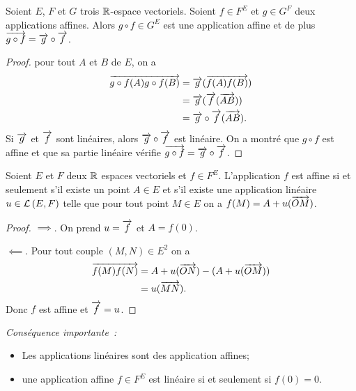 \begin{prop}
  Soient \(E\), \(F\) et \(G\) trois \(\mathbb{R}\)-espace vectoriels. Soient \(f \in
  F^E\) et \(g \in G^F\) deux applications affines. Alors \(g \circ f \in G^E\)
  est une application affine et de plus \(\overrightarrow{g \circ f}=\overrightarrow{g}\circ
  \overrightarrow{f}\).
\end{prop}
\begin{proof}
  pour tout \(A\) et \(B\) de \(E\), on a
  \begin{align*}
    \overrightarrow{g\circ f(A) g\circ f(B)} &= \overrightarrow{g} (\overrightarrow{f(A)f(B)}) \\
    &=\overrightarrow{g}(\overrightarrow{f}(\overrightarrow{AB})) \\
    &=\overrightarrow{g}\circ \overrightarrow{f} (\overrightarrow{AB}).
  \end{align*}
  Si \(\overrightarrow{g}\) et \(\overrightarrow{f}\) sont linéaires, alors \(\overrightarrow{g}\circ
  \overrightarrow{f}\) est linéaire. On a montré que \(g \circ f\) est affine et que sa
  partie linéaire vérifie \(\overrightarrow{g \circ f}=\overrightarrow{g}\circ \overrightarrow{f}\).
\end{proof}

\begin{prop}
  Soient \(E\) et \(F\) deux \(\mathbb{R}\) espaces vectoriels et \(f \in F^E\).
  L'application \(f\) est affine si et seulement s'il existe un point \(A\in E\)
  et s'il existe une application linéaire \(u \in \mathcal{L}\left(E,F\right)\) telle que pour
  tout point \(M \in E\) on a \(f(M)=A+u(\overrightarrow{OM})\).
\end{prop}
\begin{proof}
  \(\implies\). On prend \(u=\overrightarrow{f}\) et \(A=f(0)\).

  \(\impliedby\). Pour tout couple \((M, N) \in E^2\) on a
  \begin{align*}
    \overrightarrow{f(M)f(N)} &= A+u(\overrightarrow{ON}) - (A+u(\overrightarrow{OM})) \\
    &=u(\overrightarrow{MN}).
  \end{align*}
  Donc \(f\) est affine et \(\overrightarrow{f}=u\).
\end{proof}

\emph{Conséquence importante~:}
\begin{itemize}
  \item Les applications linéaires sont des application affines;
  \item une application affine \(f \in F^E\) est linéaire si et seulement si
    \(f(0)=0\).
\end{itemize}

